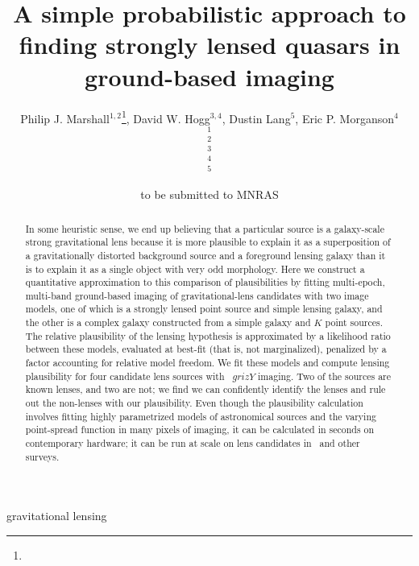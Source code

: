 \documentclass[useAMS,usenatbib]{mn2e}
\title[finding lensed quasars]{A simple probabilistic approach to finding strongly lensed quasars in ground-based imaging}
\author[]{%
  Philip J. Marshall$^{1,2}$\thanks{\pjmemail},
  David W. Hogg$^{3,4}$,
  Dustin Lang$^{5}$,
  Eric P. Morganson$^{4}$ 
  \medskip\\
  $^1$\oxford\\
  $^2$\kipac\\
  $^3$\nyu\\
  $^4$\mpia\\
  $^5$\cmu
}
\begin{document}
             
\date{to be submitted to MNRAS}
             
\pagerange{\pageref{firstpage}--\pageref{lastpage}}

\maketitle           

\label{firstpage}


\begin{abstract}
In some heuristic sense, we end up believing that a particular source
is a galaxy-scale strong gravitational lens because it is more
plausible to explain it as a superposition of a gravitationally
distorted background source and a foreground lensing galaxy than it is
to explain it as a single object with very odd morphology.  Here we
construct a quantitative approximation to this comparison of
plausibilities by fitting multi-epoch, multi-band ground-based imaging
of gravitational-lens candidates with two image models, one of which
is a strongly lensed point source and simple lensing galaxy, and the
other is a complex galaxy constructed from a simple galaxy and $K$
point sources.  The relative plausibility of the lensing hypothesis is
approximated by a likelihood ratio between these models, evaluated at
best-fit (that is, not marginalized), penalized by a factor accounting
for relative model freedom.  We fit these models and compute lensing
plausibility for four candidate lens sources with \panstarrs\ $grizY$
imaging.  Two of the sources are known lenses, and two are not; we
find we can confidently identify the lenses and rule out the
non-lenses with our plausibility.  Even though the plausibility
calculation involves fitting highly parametrized models of
astronomical sources and the varying point-spread function in many
pixels of imaging, it can be calculated in seconds on contemporary
hardware; it can be run at scale on lens candidates in \panstarrs\ and
other surveys.
\end{abstract}


\begin{keywords}
  gravitational lensing
\end{keywords}

\setcounter{footnote}{1}
\end{document}
